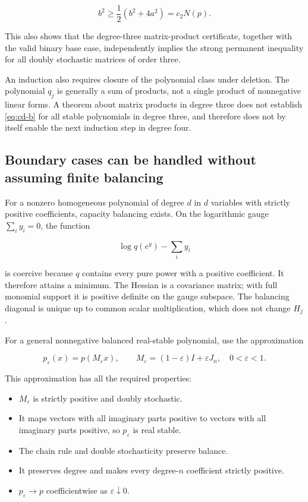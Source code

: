 \documentclass[11pt,a4paper]{article}
\providecommand{\tightlist}{\setlength{\itemsep}{0pt}\setlength{\parskip}{0pt}}
\theoremstyle{definition}
\theoremstyle{remark}
\begin{document}
\[
b^2\ge\frac12(b^2+4a^2)=c_2N(p).
\]

This also shows that the degree-three matrix-product certificate,
together with the valid binary base case, independently implies the
strong permanent inequality for all doubly stochastic matrices of order
three.

An induction also requires closure of the polynomial class under deletion. The polynomial
\(q_j\) is generally a sum of products, not a single product of
nonnegative linear forms. A theorem about matrix products in degree
three does not establish \eqref{eq:cd-b} for all stable polynomials in degree
three, and therefore does not by itself enable the next induction step
in degree four.

\subsection{Boundary cases can be handled without assuming finite
balancing}\label{deletion-boundary-cases-can-be-handled-without-assuming-finite-balancing}

For a nonzero homogeneous polynomial of degree \(d\) in \(d\) variables
with strictly positive coefficients, capacity balancing exists. On the
logarithmic gauge \(\sum_i y_i=0\), the function

\[
\log q(e^y)-\sum_i y_i
\]

is coercive because \(q\) contains every pure power with a positive
coefficient. It therefore attains a minimum. The Hessian is a covariance
matrix; with full monomial support it is positive definite on the gauge
subspace. The balancing diagonal is unique up to common scalar
multiplication, which does not change \(H_j\).

For a general nonnegative balanced real-stable polynomial, use the approximation

\[
p_\varepsilon(x)=p(M_\varepsilon x),\qquad
M_\varepsilon=(1-\varepsilon)I+\varepsilon J_n,\quad 0<\varepsilon<1.
\]

This approximation has all the required properties:

\begin{itemize}
\tightlist
\item
  \(M_\varepsilon\) is strictly positive and doubly stochastic.
\item
  It maps vectors with all imaginary parts positive to vectors with all
  imaginary parts positive, so \(p_\varepsilon\) is real stable.
\item
  The chain rule and double stochasticity preserve balance.
\item
  It preserves degree and makes every degree-\(n\) coefficient strictly
  positive.
\item
  \(p_\varepsilon\to p\) coefficientwise as \(\varepsilon\downarrow0\).
\end{itemize}
\end{document}
